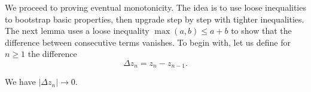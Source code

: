 
We proceed to proving eventual monotonicity. The idea is to use loose inequalities to bootstrap basic properties, then upgrade step by step with tighter inequalities. The next lemma uses a loose inequality $\max(a,b)\le a+b$ to show that the difference between consecutive terms vanishes. To begin with, let us define for $n\ge 1$ the difference
$$\Delta z_n = z_{n} - z_{n-1}.$$

\begin{lemma}
  \label{lem:vanishing-difference}
  We have $|\Delta z_n| \to 0$.
\end{lemma}

